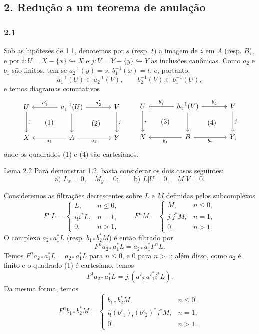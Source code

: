 \subsection*{2. Redução a um teorema de anulação}

\subsubsection*{2.1}
Sob as hipóteses de 1.1, denotemos por $s$ (resp. $t$) a imagem de $z$ em $A$ (resp. $B$), e por $i:U=X-\{x\}\hookrightarrow X$ e $j:V=Y-\{y\}\hookrightarrow Y$ as inclusões canônicas. Como $a_2$ e $b_1$ são finitos, tem-se $a_2^{-1}(y)=s$, $b_1^{-1}(x)=t$, e, portanto,
\[
a_1^{-1}(U)\subset a_2^{-1}(V),\qquad b_2^{-1}(V)\subset b_1^{-1}(U),
\]
e temos diagramas comutativos
\[
\begin{tikzcd}[column sep=large,row sep=large]
U \arrow[d,"i"] \arrow[rd,phantom,"(1)"{description}] & a_1^{-1}(U) \arrow[l,"a'_1"'] \arrow[r,"a'_2"] \arrow[d] \arrow[rd,phantom,"(2)"{description}] & V \arrow[d,"j"]\\
X & A \arrow[l,"a_1"] \arrow[r,"a_2"'] & Y
\end{tikzcd}
\qquad
\begin{tikzcd}[column sep=large,row sep=large]
U \arrow[d,"i"] \arrow[rd,phantom,"(3)"{description}] & b_2^{-1}(V) \arrow[l,"b'_1"'] \arrow[r,"b'_2"] \arrow[d] \arrow[rd,phantom,"(4)"{description}] & V \arrow[d,"j"]\\
X & B \arrow[l,"b_1"] \arrow[r,"b_2"'] & Y ,
\end{tikzcd}
\]
onde os quadrados (1) e (4) são cartesianos.

\begin{statement}{Lema 2.2}
Para demonstrar 1.2, basta considerar os dois casos seguintes:
\[
\text{a) } L_x=0,\quad M_y=0;\qquad
\text{b) } L|U=0,\quad M|V=0 .
\]
\end{statement}

Consideremos as filtrações decrescentes sobre $L$ e $M$ definidas pelos subcomplexos
\[
F^nL=
\begin{cases}
L,& n\le 0,\\
i_!i^*L,& n=1,\\
0,& n>1,
\end{cases}
\qquad
F^nM=
\begin{cases}
M,& n\le 0,\\
j_!j^*M,& n=1,\\
0,& n>1.
\end{cases}
\]
O complexo $a_{2*}a_1^*L$ (resp. $b_{1*}b_2^*M$) é então filtrado por
\[
F^n a_{2*}a_1^*L=a_{2*}a_1^*F^nL.
\]
Temos $F^n a_{2*}a_1^*L=a_{2*}a_1^*L$ para $n\le 0$, e $0$ para $n>1$; além disso, como $a_2$ é finito e o quadrado (1) é cartesiano, temos
\[
F^1a_{2*}a_1^*L=j_!(a'_{2!}a'^*_1i^*L).
\]
Da mesma forma, temos
\[
F^n b_{1*}b_2^*M=
\begin{cases}
b_{1*}b_2^*M,& n\le 0,\\
i_!(b'_1)_!(b'_2)^*j^*M,& n=1,\\
0,& n>1.
\end{cases}
\]

